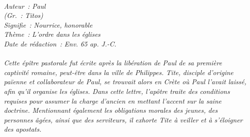 \BFont
\noindent\hrulefill
{\footnotesize
\textit{
\bigskip
{\centering{}
\\Auteur~: Paul
\\(Gr.~: Titos)
\\Signifie~: Nourrice, honorable
\\Thème~: L'ordre dans les églises
\\Date de rédaction~: Env. 65 ap. J.-C.\\}
}
\textit{
\\Cette épître pastorale fut écrite après la libération de Paul de sa première captivité romaine, peut-être dans la ville de Philippes. Tite, disciple d'origine païenne et collaborateur de Paul, se trouvait alors en Crète où Paul l'avait laissé, afin qu'il organise les églises. Dans cette lettre, l'apôtre traite des conditions requises pour assumer la charge d'ancien en mettant l'accent sur la saine doctrine. Mentionnant également les obligations morales des jeunes, des personnes âgées, ainsi que des serviteurs, il exhorte Tite à veiller et à s'éloigner des apostats.\bigskip
}
}
\par\nobreak\noindent\hrulefill
